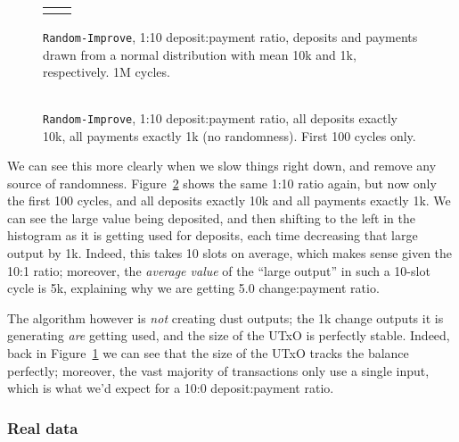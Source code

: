\documentclass{article}
\theoremstyle{definition}{
  \newtheorem{lemma}{Lemma}[section] %
  \newtheorem{definition}[lemma]{Definition}
}
\theoremstyle{theorem}{
  \newtheorem{invariant}[lemma]{Invariant}
  \newtheorem{proofobligation}[lemma]{Proof Obligation}
}
\numberwithin{equation}{lemma}
\begin{document}
\begin{figure}[p]
\begin{center}
\scriptsize
\begin{tabular}{ll}
 &

\end{tabular}
\end{center}
\caption{\label{fig:inputselection:normal_1to10_randomOn}
  \texttt{Random-Improve}, 1:10 deposit:payment ratio, deposits and
  payments drawn from a normal distribution with mean 10k and 1k, respectively.
  1M cycles.
}
\end{figure}

\begin{figure}[p]
\begin{center}
\scriptsize
\begin{tabular}{l}

\end{tabular}
\end{center}
\caption{\label{fig:inputselection:constant_1to10_randomOn}
  \texttt{Random-Improve}, 1:10 deposit:payment ratio, all deposits exactly
  10k, all payments exactly 1k (no randomness). First 100 cycles only.
}
\end{figure}

We can see this more clearly
when we slow things right down, and remove any source of randomness. Figure~\ref{fig:inputselection:constant_1to10_randomOn} shows the
same 1:10 ratio again, but now only the first 100 cycles, and all deposits
exactly 10k and all payments exactly 1k.
We can see the large value being deposited, and then shifting to the left in the
histogram as it is getting used for deposits, each time decreasing that large
output by 1k. Indeed, this takes 10 slots on average, which makes sense given
the 10:1 ratio; moreover, the \emph{average value} of the ``large output'' in such a
10-slot cycle is 5k, explaining why we are getting 5.0 change:payment ratio.

The algorithm however is \emph{not} creating dust outputs; the 1k change outputs
it is generating \emph{are} getting used, and the size of the UTxO is perfectly
stable. Indeed, back in Figure~\ref{fig:inputselection:normal_1to10_randomOn} we
can see that the size of the UTxO tracks the balance perfectly; moreover, the
vast majority of transactions only use a single input, which is what we'd expect
for a 10:0 deposit:payment ratio.

\subsubsection{Real data}
\end{document}
